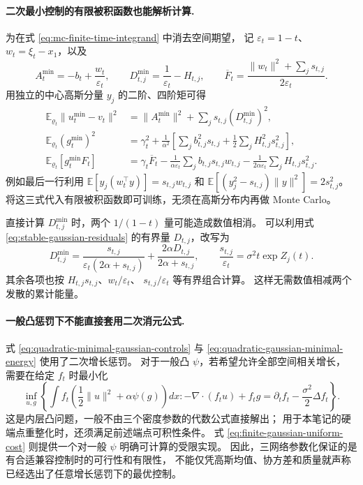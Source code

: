 \documentclass[UTF8,a4paper,11pt,fontset=fandol]{ctexart}
\begin{document}
\paragraph{二次最小控制的有限被积函数也能解析计算.}
为在式 \eqref{eq:mc-finite-time-integrand} 中消去空间期望，
记 $\varepsilon_t=1-t$、$w_t=\xi_t-x_1$，以及
\begin{equation}
A_t^{\min}=-b_t+\frac{w_t}{\varepsilon_t},\qquad
D_{t,j}^{\min}=\frac1{\varepsilon_t}-H_{t,j},\qquad
\overline F_t=\frac{\|w_t\|^2+\sum_js_{t,j}}{2\varepsilon_t}.
\end{equation}
用独立的中心高斯分量 $y_j$ 的二阶、四阶矩可得
\begin{equation}
\begin{aligned}
\mathbb E_{\varrho_t}\|u_t^{\min}-v_t\|^2
&=\|A_t^{\min}\|^2+\sum_js_{t,j}(D_{t,j}^{\min})^2,\\
\mathbb E_{\varrho_t}(g_t^{\min})^2
&=\gamma_t^2+\frac1{\alpha^2}
\left[\sum_j b_{t,j}^2s_{t,j}
+\frac12\sum_jH_{t,j}^2s_{t,j}^2\right],\\
\mathbb E_{\varrho_t}[g_t^{\min}F_t]
&=\gamma_t\overline F_t
-\frac1{\alpha\varepsilon_t}\sum_j b_{t,j}s_{t,j}w_{t,j}
-\frac1{2\alpha\varepsilon_t}\sum_jH_{t,j}s_{t,j}^2.
\end{aligned}
\label{eq:quadratic-finite-integrand-moments}
\end{equation}
例如最后一行利用
$\mathbb E[y_j(w_t^\top y)]=s_{t,j}w_{t,j}$ 和
$\mathbb E[(y_j^2-s_{t,j})\|y\|^2]=2s_{t,j}^2$。
将这三式代入有限被积函数即可训练，无须在高斯分布内再做 Monte Carlo。

直接计算 $D_{t,j}^{\min}$ 时，两个 $1/(1-t)$ 量可能造成数值相消。
可以利用式 \eqref{eq:stable-gaussian-residuals} 的有界量 $D_{t,j}$，改写为
\begin{equation}
D_{t,j}^{\min}
=\frac{s_{t,j}}{\varepsilon_t(2\alpha+s_{t,j})}
+\frac{2\alpha D_{t,j}}{2\alpha+s_{t,j}},\qquad
\frac{s_{t,j}}{\varepsilon_t}=\sigma^2t\exp Z_j(t).
\end{equation}
其余各项也按 $H_{t,j}s_{t,j}$、$w_t/\varepsilon_t$、
$s_{t,j}/\varepsilon_t$ 等有界组合计算。
这样无需数值相减两个发散的累计能量。

\paragraph{一般凸惩罚下不能直接套用二次消元公式.}
式 \eqref{eq:quadratic-minimal-gaussian-controls} 与
\eqref{eq:quadratic-gaussian-minimal-energy} 使用了二次增长惩罚。
对于一般凸 $\psi$，若希望允许全部空间相关增长，
需要在给定 $f_t$ 时最小化
\begin{equation}
\inf_{u,g}\left\{
\int f_t\left(\frac12\|u\|^2+\alpha\psi(g)\right)dx:
-\nabla\cdot(f_tu)+f_tg
=\partial_tf_t-\frac{\sigma^2}{2}\Delta f_t\right\}.
\end{equation}
这是内层凸问题，一般不由三个密度参数的代数公式直接解出；
用于本笔记的硬端点重整化时，还须满足前述端点可积性条件。
式 \eqref{eq:finite-gaussian-uniform-cost} 则提供一个对一般 $\psi$ 明确可计算的受限实现。
因此，三网络参数化保证的是有合适兼容控制时的可行性和有限性，
不能仅凭高斯均值、协方差和质量就声称已经选出了任意增长惩罚下的最优控制。
\end{document}

